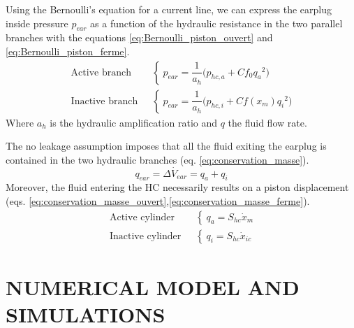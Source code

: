 \documentclass[3p,twocolumn,preprint]{elsarticle}
\begin{document}
Using the Bernoulli's equation for a current line, we can express the earplug inside pressure $p_{ear}$ as a function of the hydraulic resistance in the two parallel branches with the equations \ref{eq:Bernoulli_piston_ouvert} and \ref{eq:Bernoulli_piston_ferme}.
\begin{align}
	\text{Active branch ~}& \left\{~
	p_{ear} = \dfrac{1}{a_h}\biggl(p_{hc,a} + Cf_0 {q_a}^2 \biggr)
	\right.
	\label{eq:Bernoulli_piston_ouvert}\\
	\text{Inactive branch ~}& \left\{~
	p_{ear} = \dfrac{1}{a_h}\biggl(p_{hc,i} + Cf(x_m) {q_i}^2 \biggr)
	\right.
	\label{eq:Bernoulli_piston_ferme}
\end{align}
Where $a_h$ is the hydraulic amplification ratio and $q$ the fluid flow rate.

The no leakage assumption imposes that all the fluid exiting the earplug is contained in the two hydraulic branches (eq. \ref{eq:conservation_masse}).
\begin{equation}
	q_{ear} = \dot{\Delta V_{ear}} = q_a + q_i
	\label{eq:conservation_masse}
\end{equation}
Moreover, the fluid entering the HC necessarily results on a piston displacement (eqs. \ref{eq:conservation_masse_ouvert},\ref{eq:conservation_masse_ferme}).
\begin{align}
	\text{Active cylinder ~}& \left\{~
	q_a = S_{hc} \dot{x}_m
	\right.
	\label{eq:conservation_masse_ouvert}\\
	\text{Inactive cylinder ~}& \left\{~
	q_i = S_{hc} \dot{x}_{ic}
	\right.
	\label{eq:conservation_masse_ferme}
\end{align}
\section{NUMERICAL MODEL AND SIMULATIONS}
\label{sec:NUMERICAL MODEL AND SIMULATIONS}
\end{document}
